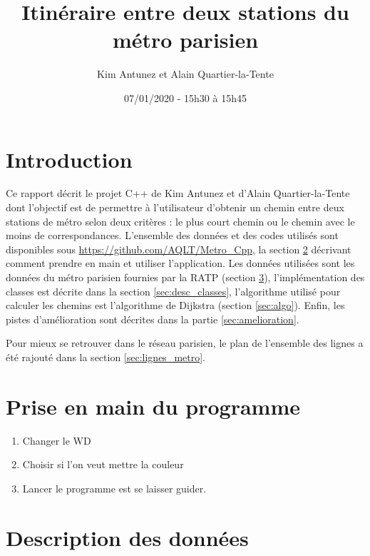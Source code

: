 \documentclass[,french]{article}
\title{Itinéraire entre deux stations du métro parisien}
\author{Kim Antunez et Alain Quartier-la-Tente}
\date{07/01/2020 - 15h30 à 15h45}
\begin{document}
\maketitle

{
\hypersetup{linkcolor=}
\setcounter{tocdepth}{2}
\tableofcontents
}
\hypertarget{introduction}{%
\section{Introduction}\label{introduction}}

Ce rapport décrit le projet C++ de Kim Antunez et d'Alain
Quartier-la-Tente dont l'objectif est de permettre à l'utilisateur
d'obtenir un chemin entre deux stations de métro selon deux critères :
le plus court chemin ou le chemin avec le moins de correspondances.
L'ensemble des données et des codes utilisés sont disponibles sous
\url{https://github.com/AQLT/Metro_Cpp}, la section
\ref{sec:pris_en_main} décrivant comment prendre en main et utiliser
l'application. Les données utilisées sont les données du métro parisien
fournies par la RATP (section \ref{sec:def_donnees}), l'implémentation
des classes est décrite dans la section \ref{sec:desc_classes},
l'algorithme utilisé pour calculer les chemins est l'algorithme de
Dijkstra (section \ref{sec:algo}). Enfin, les pistes d'amélioration sont
décrites dans la partie \ref{sec:amelioration}.

Pour mieux se retrouver dans le réseau parisien, le plan de l'ensemble
des lignes a été rajouté dans la section \ref{sec:lignes_metro}.

\hypertarget{sec:pris_en_main}{%
\section{Prise en main du programme}\label{sec:pris_en_main}}

\begin{enumerate}
\def\labelenumi{\arabic{enumi}.}
\item
  Changer le WD
\item
  Choisir si l'on veut mettre la couleur
\item
  Lancer le programme est se laisser guider.
\end{enumerate}

\hypertarget{sec:def_donnees}{%
\section{Description des données}\label{sec:def_donnees}}
\end{document}
